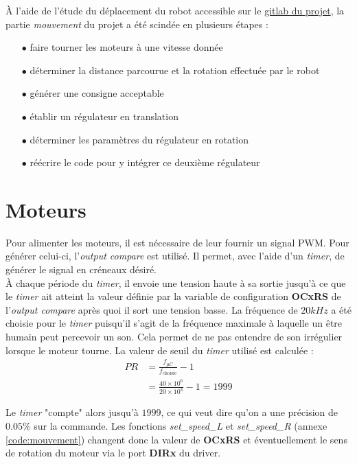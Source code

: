 À l'aide de l'étude du déplacement du robot accessible sur le \href{https://gitlab.com/mosee/elech309-2024}{gitlab du projet}, la partie \textit{mouvement} du projet a été scindée en plusieurs étapes :

\begin{enumerate}
    \item[$\bullet$] faire tourner les moteurs à une vitesse donnée
    \item[$\bullet$] déterminer la distance parcourue et la rotation effectuée par le robot
    \item[$\bullet$] générer une consigne acceptable
    \item[$\bullet$] établir un régulateur en translation
    \item[$\bullet$] déterminer les paramètres du régulateur en rotation
    \item[$\bullet$] réécrire le code pour y intégrer ce deuxième régulateur
\end{enumerate}

\section{Moteurs}

Pour alimenter les moteurs, il est nécessaire de leur fournir un signal PWM. Pour générer celui-ci, l'\textit{output compare} est utilisé. Il permet, avec l'aide d'un \textit{timer}, de générer le signal en créneaux désiré.\\ À chaque période du \textit{timer}, il envoie une tension haute à sa sortie jusqu'à ce que le \textit{timer} ait atteint la valeur définie par la variable de configuration \textbf{OCxRS} de l'\textit{output compare} après quoi il sort une tension basse. La fréquence de $20 kHz$ a été choisie pour le \textit{timer} puisqu'il s'agit de la fréquence maximale à laquelle un être humain peut percevoir un son. Cela permet de ne pas entendre de son irrégulier lorsque le moteur tourne. La valeur de seuil du \textit{timer} utilisé est calculée :\\

\begin{align*}
    PR &= \frac{f_{\mu C}}{f_{\text{choisie}}} - 1\\
    &= \frac{40\times10^6}{20\times10^3}-1 = 1999
\end{align*}

Le \textit{timer} "compte" alors jusqu'à $1999$, ce qui veut dire qu'on a une précision de $0.05\%$ sur la commande. Les fonctions \textit{set\_speed\_L} et \textit{set\_speed\_R} (annexe \ref{code:mouvement}) changent donc la valeur de \textbf{OCxRS} et éventuellement le sens de rotation du moteur via le port \textbf{DIRx} du driver.


